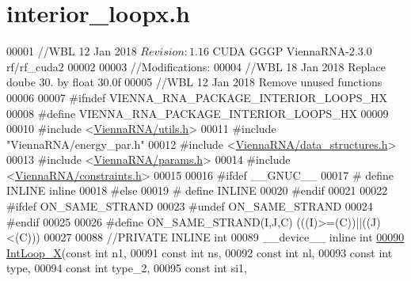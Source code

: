 \hypertarget{interior__loopx_8h_source}{}\section{interior\+\_\+loopx.\+h}
\label{interior__loopx_8h_source}

\begin{DoxyCode}
00001 \textcolor{comment}{//WBL 12 Jan 2018 $Revision: 1.16 $ CUDA GGGP ViennaRNA-2.3.0 rf/rf\_cuda2}
00002 
00003 \textcolor{comment}{//Modifications:}
00004 \textcolor{comment}{//WBL 18 Jan 2018 Replace doube 30. by float 30.0f}
00005 \textcolor{comment}{//WBL 12 Jan 2018 Remove unused functions}
00006 
00007 \textcolor{preprocessor}{#ifndef VIENNA\_RNA\_PACKAGE\_INTERIOR\_LOOPS\_HX}
00008 \textcolor{preprocessor}{#define VIENNA\_RNA\_PACKAGE\_INTERIOR\_LOOPS\_HX}
00009 
00010 \textcolor{preprocessor}{#include <\mbox{\hyperlink{utils_8h}{ViennaRNA/utils.h}}>}
00011 \textcolor{preprocessor}{#include "ViennaRNA/energy\_par.h"}
00012 \textcolor{preprocessor}{#include <\mbox{\hyperlink{data__structures_8h}{ViennaRNA/data\_structures.h}}>}
00013 \textcolor{preprocessor}{#include <\mbox{\hyperlink{params_8h}{ViennaRNA/params.h}}>}
00014 \textcolor{preprocessor}{#include <\mbox{\hyperlink{constraints_8h}{ViennaRNA/constraints.h}}>}
00015 
00016 \textcolor{preprocessor}{#ifdef \_\_GNUC\_\_}
00017 \textcolor{preprocessor}{# define INLINE inline}
00018 \textcolor{preprocessor}{#else}
00019 \textcolor{preprocessor}{# define INLINE}
00020 \textcolor{preprocessor}{#endif}
00021 
00022 \textcolor{preprocessor}{#ifdef ON\_SAME\_STRAND}
00023 \textcolor{preprocessor}{#undef ON\_SAME\_STRAND}
00024 \textcolor{preprocessor}{#endif}
00025 
00026 \textcolor{preprocessor}{#define ON\_SAME\_STRAND(I,J,C)  (((I)>=(C))||((J)<(C)))}
00027 
00088 \textcolor{comment}{//PRIVATE INLINE int}
00089 \_\_device\_\_ \textcolor{keyword}{inline} \textcolor{keywordtype}{int}
\mbox{\hyperlink{group__loops_ga2c300faa922acafdc2c7322d6671f910}{00090}} \mbox{\hyperlink{group__loops_ga2c300faa922acafdc2c7322d6671f910}{IntLoop\_X}}(\textcolor{keyword}{const} \textcolor{keywordtype}{int} n1,
00091           \textcolor{keyword}{const} \textcolor{keywordtype}{int} ns,
00092           \textcolor{keyword}{const} \textcolor{keywordtype}{int} nl,
00093           \textcolor{keyword}{const} \textcolor{keywordtype}{int} type,
00094           \textcolor{keyword}{const} \textcolor{keywordtype}{int} type\_2,
00095           \textcolor{keyword}{const} \textcolor{keywordtype}{int} si1,

\end{DoxyCode}
